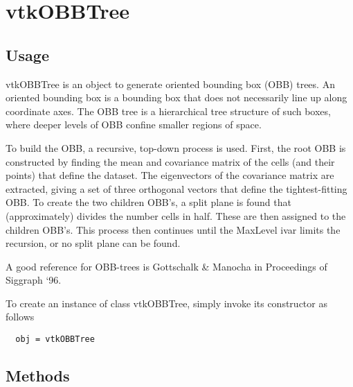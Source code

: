 \section{vtkOBBTree}

\subsection{Usage}

 vtkOBBTree is an object to generate oriented bounding box (OBB) trees.
 An oriented bounding box is a bounding box that does not necessarily line 
 up along coordinate axes. The OBB tree is a hierarchical tree structure 
 of such boxes, where deeper levels of OBB confine smaller regions of space.

 To build the OBB, a recursive, top-down process is used. First, the root OBB
 is constructed by finding the mean and covariance matrix of the cells (and
 their points) that define the dataset. The eigenvectors of the covariance
 matrix are extracted, giving a set of three orthogonal vectors that define 
 the tightest-fitting OBB. To create the two children OBB's, a split plane 
 is found that (approximately) divides the number cells in half. These are 
 then assigned to the children OBB's. This process then continues until
 the MaxLevel ivar limits the recursion, or no split plane can be found.

 A good reference for OBB-trees is Gottschalk \& Manocha in Proceedings of 
 Siggraph `96.

To create an instance of class vtkOBBTree, simply
invoke its constructor as follows
\begin{verbatim}
  obj = vtkOBBTree
\end{verbatim}
\subsection{Methods}

